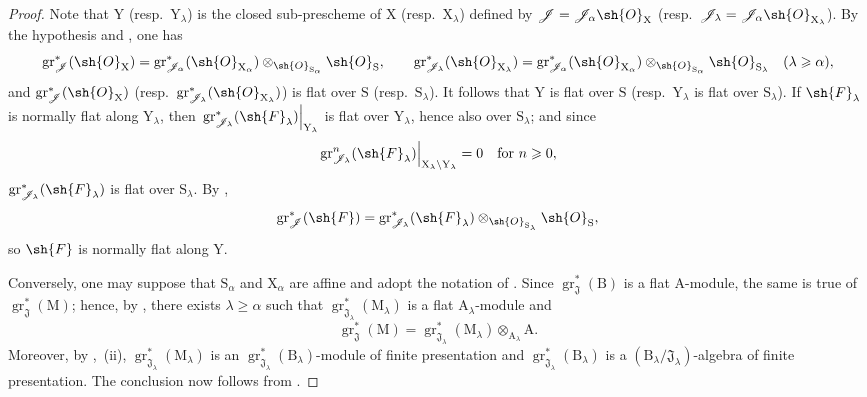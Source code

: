 \begin{proof}
Note that $\mathrm{Y}$ (resp.\ $\mathrm{Y}_\lambda$) is the closed sub-prescheme of $\mathrm{X}$ (resp.\ $\mathrm{X}_\lambda$) defined by $\mathscr{J}=\mathscr{J}_\alpha\sh{O}_\mathrm{X}$ (resp.\ $\mathscr{J}_\lambda=\mathscr{J}_\alpha\sh{O}_{\mathrm{X}_\lambda}$). By the hypothesis and , one has
\[
\operatorname{gr}^*_\mathscr{J}(\sh{O}_\mathrm{X})
=\operatorname{gr}^*_{\mathscr{J}_\alpha}(\sh{O}_{\mathrm{X}_\alpha})
 \otimes_{\sh{O}_{\mathrm{S}_\alpha}}\sh{O}_\mathrm{S},
\qquad
\operatorname{gr}^*_{\mathscr{J}_\lambda}(\sh{O}_{\mathrm{X}_\lambda})
=\operatorname{gr}^*_{\mathscr{J}_\alpha}(\sh{O}_{\mathrm{X}_\alpha})
 \otimes_{\sh{O}_{\mathrm{S}_\alpha}}\sh{O}_{\mathrm{S}_\lambda}
\quad(\lambda\geqslant\alpha),
\]
and $\operatorname{gr}^*_\mathscr{J}(\sh{O}_\mathrm{X})$ (resp.\ $\operatorname{gr}^*_{\mathscr{J}_\lambda}(\sh{O}_{\mathrm{X}_\lambda})$) is flat over $\mathrm{S}$ (resp.\ $\mathrm{S}_\lambda$). It follows that $\mathrm{Y}$ is flat over $\mathrm{S}$ (resp.\ $\mathrm{Y}_\lambda$ is flat over $\mathrm{S}_\lambda$). If $\sh{F}_\lambda$ is normally flat along $\mathrm{Y}_\lambda$, then $\left.\operatorname{gr}^*_{\mathscr{J}_\lambda}(\sh{F}_\lambda)\right|_{\mathrm{Y}_\lambda}$ is flat over $\mathrm{Y}_\lambda$, hence also over $\mathrm{S}_\lambda$; and since
\[
\left.\operatorname{gr}^n_{\mathscr{J}_\lambda}(\sh{F}_\lambda)\right|_{\mathrm{X}_\lambda\setminus\mathrm{Y}_\lambda}=0
\quad\text{for }n\geqslant0,
\]
$\operatorname{gr}^*_{\mathscr{J}_\lambda}(\sh{F}_\lambda)$ is flat over $\mathrm{S}_\lambda$. By ,
\[
\operatorname{gr}^*_\mathscr{J}(\sh{F})
=\operatorname{gr}^*_{\mathscr{J}_\lambda}(\sh{F}_\lambda)
 \otimes_{\sh{O}_{\mathrm{S}_\lambda}}\sh{O}_\mathrm{S},
\]
so $\sh{F}$ is normally flat along $\mathrm{Y}$.

Conversely, one may suppose that $\mathrm{S}_\alpha$ and $\mathrm{X}_\alpha$ are affine and adopt the notation of . Since $\operatorname{gr}^*_\mathfrak{J}(\mathrm{B})$ is a flat $\mathrm{A}$-module, the same is true of $\operatorname{gr}^*_\mathfrak{J}(\mathrm{M})$; hence, by , there exists $\lambda\geqslant\alpha$ such that $\operatorname{gr}^*_{\mathfrak{J}_\lambda}(\mathrm{M}_\lambda)$ is a flat $\mathrm{A}_\lambda$-module and
\[
\operatorname{gr}^*_\mathfrak{J}(\mathrm{M})
=\operatorname{gr}^*_{\mathfrak{J}_\lambda}(\mathrm{M}_\lambda)
 \otimes_{\mathrm{A}_\lambda}\mathrm{A}.
\]
Moreover, by ,~(ii), $\operatorname{gr}^*_{\mathfrak{J}_\lambda}(\mathrm{M}_\lambda)$ is an $\operatorname{gr}^*_{\mathfrak{J}_\lambda}(\mathrm{B}_\lambda)$-module of finite presentation and $\operatorname{gr}^*_{\mathfrak{J}_\lambda}(\mathrm{B}_\lambda)$ is a $(\mathrm{B}_\lambda/\mathfrak{J}_\lambda)$-algebra of finite presentation. The conclusion now follows from .
\end{proof}

